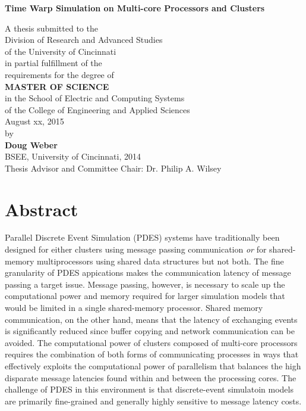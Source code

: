 \documentclass[11pt]{book}
\begin{document}
\thispagestyle{empty}

\doublespacing

\vspace*{0.5in}

\begin{center}
\LARGE{\textbf{Time Warp Simulation on Multi-core Processors and Clusters}}

\vspace*{0.4in}

  {\large A thesis submitted to the\\[0.20in]
    Division of Research and Advanced Studies\\
    of the University of Cincinnati\\[0.20in]
    in partial fulfillment of the\\
    requirements for the degree of\\[0.20in]
    \textbf{MASTER OF SCIENCE}\\[0.20in]
    in the School of Electric and Computing Systems\\
    of the College of Engineering and Applied Sciences\\[0.20in]
    August xx, 2015\\[0.20in]
    by\\[0.20in]
    \textbf{Doug Weber}\\
    BSEE, University of Cincinnati, 2014\\}
  \vspace{0.5in}
  {\large Thesis Advisor and Committee Chair:  Dr. Philip A. Wilsey}
\end{center}

\clearpage

\setcounter{page}{1}
\clearpage

\chapter*{Abstract}

Parallel Discrete Event Simulation (PDES) systems have traditionally been designed for
either clusters using message passing communication \emph{or} for shared-memory
multiprocessors using shared data structures but not both.  The fine granularity of PDES
appications makes the communication latency of message passing a target issue.  Message
passing, however, is necessary to scale up the computational power and memory required for
larger simulation models that would be limited in a single shared-memory processor.
Shared memory communication, on the other hand, means that the latency of exchanging
events is significantly reduced since buffer copying and network communication can be
avoided.  The computational power of clusters composed of multi-core processors requires
the combination of both forms of communicating processes in ways that effectively exploits
the computational power of parallelism that balances the high disparate message latencies
found within and between the processing cores.  The challenge of PDES in this environment
is that discrete-event simulatoin models are primarily fine-grained and generally highly
sensitive to message latency costs.
\end{document}
